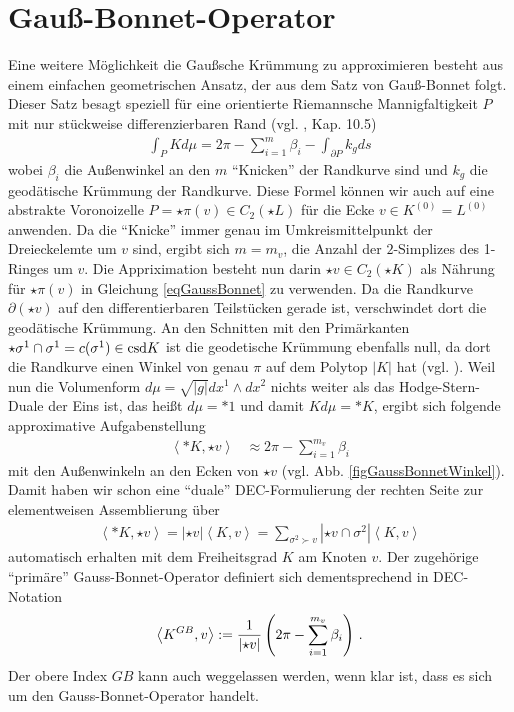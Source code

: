 \section{Gauß-Bonnet-Operator}
  Eine weitere Möglichkeit die Gaußsche Krümmung zu approximieren besteht aus einem einfachen geometrischen Ansatz, der aus dem Satz von
  Gauß-Bonnet folgt. 
  Dieser Satz besagt speziell für eine orientierte Riemannsche Mannigfaltigkeit \( P \) mit nur stückweise differenzierbaren Rand (vgl.
  \cite{berger}, Kap. 10.5)
  \begin{align}
    \label{eqGaussBonnet}
    \int_{P}K d\mu = 2\pi - \sum_{i=1}^{m}\beta_{i} - \int_{\partial P} k_{g} ds
  \end{align}
  wobei \( \beta_{i} \) die Außenwinkel an den \( m \) "`Knicken"' der Randkurve sind und \( k_{g} \) die geodätische Krümmung der
  Randkurve.
  Diese Formel können wir auch auf eine abstrakte Voronoizelle \( P=\star\pi(v)\in C_{2}(\star L) \) für die Ecke \( v \in K^{(0)}=L^{(0)} \)
  anwenden. 
  Da die "`Knicke"' immer genau im Umkreismittelpunkt der Dreieckelemte um \( v \) sind, 
  ergibt sich \( m=m_{v} \), die Anzahl der \( 2 \)-Simplizes des 1-Ringes um \( v \).
  Die Appriximation besteht nun darin \( \star v \in C_{2}(\star K) \) als Nährung für \( \star\pi(v) \) in Gleichung \eqref{eqGaussBonnet}
  zu verwenden.
  Da die Randkurve \( \partial(\star v) \) auf den differentierbaren Teilstücken gerade ist, verschwindet dort die geodätische Krümmung.
  An den Schnitten mit den Primärkanten \( \star\sigma^{1}\cap\sigma^{1} = c(\sigma^{1})\in \text{csd} K \) ist die geodetische Krümmung ebenfalls null,
  da dort die Randkurve einen Winkel von genau \( \pi \) auf dem Polytop \( |K| \) hat (vgl. \cite{polthier}).
  Weil nun die Volumenform \( d\mu = \sqrt{|g|} dx^{1} \wedge dx^{2} \) nichts weiter als das Hodge-Stern-Duale der Eins ist, das heißt 
  \( d\mu = *1 \) und damit \(  K d\mu = *K \), ergibt sich folgende approximative Aufgabenstellung
  \begin{align}
      \label{eqDualGaussBonnet}
      \left\langle *K , \star v \right\rangle &\approx 2\pi - \sum_{i=1}^{m_{v}}\beta_{i}
  \end{align}
  mit den Außenwinkeln an den Ecken von \( \star v \) (vgl. Abb. \ref{figGaussBonnetWinkel}).
  Damit haben wir schon eine "`duale"' DEC-Formulierung der rechten Seite zur elementweisen Assemblierung über
  \begin{align}
    \left\langle *K , \star v \right\rangle = \left| \star v \right|\left\langle K, v \right\rangle
                          = \sum_{\sigma^{2}\succ v} \left| \star v \cap \sigma^{2} \right| \left\langle K, v \right\rangle
  \end{align}
  automatisch erhalten mit dem Freiheitsgrad \( K \) am Knoten \( v \).
  Der zugehörige "`primäre"' Gauss-Bonnet-Operator definiert sich dementsprechend in DEC-Notation
  \begin{align}
    \left\langle K^{GB},v \right\rangle := \frac{1}{\left| \star v \right|} \left( 2\pi - \sum_{i=1}^{m_{v}}\beta_{i} \right) \,\text{.}
  \end{align}
  Der obere Index \( GB \) kann auch weggelassen werden, wenn klar ist, dass es sich um den Gauss-Bonnet-Operator handelt.

